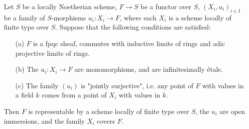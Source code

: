 \begin{proposition}\label{scheme functor over Noe representable if surjective subopen functor}
Let $S$ be a locally Noetherian scheme, $F\to S$ be a functor over $S$, $(X_i,u_i)_{i\in I}$ be a family of $S$-morphisms $u_i:X_i\to F$, where each $X_i$ is a scheme locally of finite type over $S$. Suppose that the following conditions are satisfied:
\begin{enumerate}
    \item[(a)] $F$ is a fpqc sheaf, commutes with inductive limits of rings and adic projective limits of rings.
    \item[(b)] The $u_i:X_i\to F$ are monomorphisms, and are infinitesimally \'etale.
    \item[(c)] The family $(u_i)$ is "jointly surjective", i.e. any point of $F$ with values in a field $k$ comes from a point of $X_i$ with values in $k$.
\end{enumerate}
Then $F$ is representable by a scheme locally of finite type over $S$, the $u_i$ are open immersions, and the family $X_i$ covers $F$.
\end{proposition}
